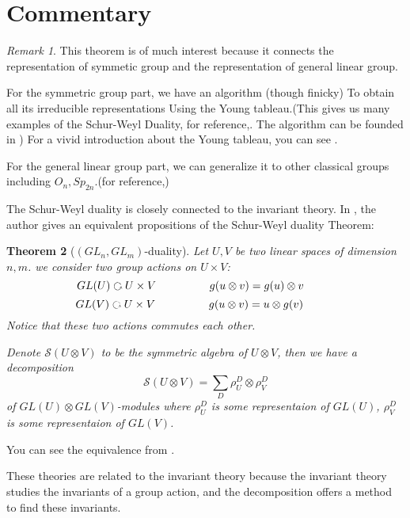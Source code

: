 \documentclass[11pt,oneside]{amsart}
\numberwithin{equation}{section}
\theoremstyle{plain}
\newtheorem{theorem}{Theorem}[section]
\theoremstyle{plain}
\numberwithin{equation}{section}
\theoremstyle{remark}
\newtheorem{remark}[theorem]{Remark}
\begin{document}
	\section{Commentary} 
	\begin{remark}
		This theorem is of much interest because it connects the representation of symmetic group and the representation of general linear group.
		
		For the symmetric group part, we have an algorithm (though finicky) To obtain all its irreducible representations Using the Young tableau.(This gives us many examples of the Schur-Weyl Duality, for reference,\cite[Example 7.0.3]{SWduality}. The algorithm can be founded in \cite[5]{SWduality}) For a vivid introduction about the Young tableau, you can see \cite{对称群表示}.
		
		For the general linear group part, we can generalize it to other classical groups including $O_n, Sp_{2n}$.(for reference,\cite[3.4]{SWduality2})
	\end{remark}
	The Schur-Weyl duality is closely connected to the invariant theory. In \cite{calderon1989local}, the author gives an equivalent propositions of the Schur-Weyl duality Theorem:
	\begin{theorem}[$(GL_{n}, GL_{m})$-duality]
		Let $U,V$ be two linear spaces of dimension $n,m$. 
		we consider two group actions on $U \times V$:
		$$\hspace{-1cm}GL(U) \text{ \rotatebox[origin=c]{270}{$\circlearrowleft$} } U \times V \qquad \hspace{1cm} g(u \otimes v)=g(u) \otimes v$$
		$$\hspace{-1cm}GL(V) \text{ \rotatebox[origin=c]{270}{$\circlearrowleft$} } U \times V \qquad \hspace{1cm} g(u \otimes v)=u \otimes g(v)$$
		Notice that these two actions commutes each other.
		
		Denote $\mathcal{S}(U \otimes V)$ to be the symmetric algebra of $U \otimes V$, then we have a decomposition
		$$\mathcal{S}(U \otimes V)=\sum_{D} \rho_{U}^{D} \otimes \rho_{V}^{D}$$
		of $GL(U) \otimes GL(V)$-modules where $\rho_{U}^{D}$ is some representaion of $GL(U)$, $\rho_{V}^{D}$ is some representaion of $GL(V)$.
	\end{theorem}
	You can see the equivalence from \cite[2.4.5]{howe1995perspectives}.
	
	These theories are related to the invariant theory because the invariant theory studies the invariants of a group action, and the decomposition offers a method to find these invariants.
	
\end{document}
